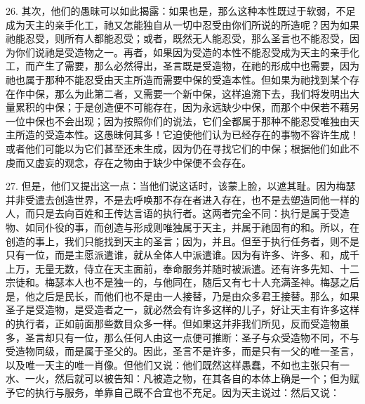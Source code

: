 26. 其次，他们的愚昧可以如此揭露：如果也是，那么这种本性既过于软弱，不足成为天主的亲手化工，祂又怎能独自从一切中忍受由你们所说的所造呢？因为如果祂能忍受，则所有人都能忍受；或者，既然无人能忍受，那么圣言也不能忍受，因为你们说祂是受造物之一。再者，如果因为受造的本性不能忍受成为天主的亲手化工，而产生了需要，那么必然得出，圣言既是受造物，在祂的形成中也需要，因为祂也属于那种不能忍受由天主所造而需要中保的受造本性。但如果为祂找到某个存在作中保，那么为此第二者，又需要一个新中保，这样追溯下去，我们将发明出大量累积的中保；于是创造便不可能存在，因为永远缺少中保，而那个中保若不藉另一位中保也不会出现；因为按照你们的说法，它们全都属于那种不能忍受唯独由天主所造的受造本性。这愚昧何其多！它迫使他们认为已经存在的事物不容许生成！或者他们可能以为它们甚至还未生成，因为仍在寻找它们的中保；根据他们如此不虔而又虚妄的观念，存在之物由于缺少中保便不会存在。\par

27. 但是，他们又提出这一点：当他们说这话时，该蒙上脸，以遮其耻。因为梅瑟并非受遣去创造世界，不是去呼唤那不存在者进入存在，也不是去塑造同他一样的人，而只是去向百姓和王传达言语的执行者。这两者完全不同：执行是属于受造物、如同仆役的事，而创造与形成则唯独属于天主，并属于祂固有的和。所以，在创造的事上，我们只能找到天主的圣言；因为，并且。但至于执行任务者，则不是只有一位，而是主愿派遣谁，就从全体人中派遣谁。因为有许多、许多、和，成千上万，无量无数，侍立在天主面前，奉命服务并随时被派遣。还有许多先知、十二宗徒和。梅瑟本人也不是独一的，与他同在，随后又有七十人充满圣神。梅瑟之后是，他之后是民长，而他们也不是由一人接替，乃是由众多君王接替。那么，如果圣子是受造物，是受造者之一，就必然会有许多这样的儿子，好让天主有许多这样的执行者，正如前面那些数目众多一样。但如果这并非我们所见，反而受造物虽多，圣言却只有一位，那么任何人由这一点便可推断：圣子与众受造物不同，不与受造物同级，而是属于圣父的。因此，圣言不是许多，而是只有一父的唯一圣言，以及唯一天主的唯一肖像。但他们又说：他们既然这样愚蠢，不如也主张只有一水、一火，然后就可以被告知：凡被造之物，在其各自的本体上确是一个；但为赋予它的执行与服务，单靠自己既不合宜也不充足。因为天主说过：然后又说：\par

